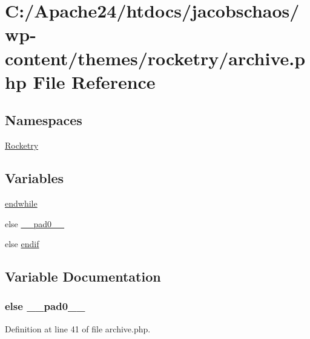 \hypertarget{archive_8php}{}\section{C\+:/\+Apache24/htdocs/jacobschaos/wp-\/content/themes/rocketry/archive.php File Reference}
\label{archive_8php}
\subsection*{Namespaces}
\begin{DoxyCompactItemize}
\item 
 \hyperlink{namespace_rocketry}{Rocketry}
\end{DoxyCompactItemize}
\subsection*{Variables}
\begin{DoxyCompactItemize}
\item 
\hyperlink{archive_8php_a1b05dae45f9e3f4c1fe86048550d2c5b}{endwhile}
\item 
else \hyperlink{archive_8php_a8e01dcc96c43199448ee66f7c2ae8ea6}{\+\_\+\+\_\+pad0\+\_\+\+\_\+}
\item 
else \hyperlink{archive_8php_ab4d017bcc79cd2827c3dce8af2570e91}{endif}
\end{DoxyCompactItemize}


\subsection{Variable Documentation}
\hypertarget{archive_8php_a8e01dcc96c43199448ee66f7c2ae8ea6}{}
\subsubsection[{\+\_\+\+\_\+pad0\+\_\+\+\_\+}]{\setlength{\rightskip}{0pt plus 5cm}else \+\_\+\+\_\+pad0\+\_\+\+\_\+}\label{archive_8php_a8e01dcc96c43199448ee66f7c2ae8ea6}


Definition at line 41 of file archive.\+php.

\hypertarget{archive_8php_ab4d017bcc79cd2827c3dce8af2570e91}{}
